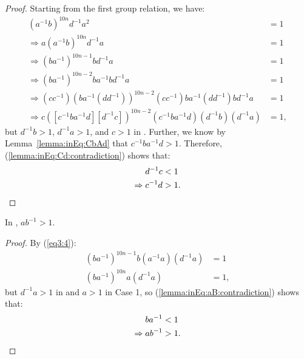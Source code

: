 \begin{proof} Starting from the first group relation, we have:
\begin{align}
(a^{-1}b)^{10n}d^{-1}a^{2}&=1\nonumber{}\\
\Rightarrow{}a(a^{-1}b)^{10n}d^{-1}a&=1\nonumber{}\\
\Rightarrow{}(ba^{-1})^{10n-1}bd^{-1}a&=1\label{eq3:4}\\
\Rightarrow{}(ba^{-1})^{10n-2}ba^{-1}bd^{-1}a&=1\nonumber{}\\
\Rightarrow{}(cc^{-1})(ba^{-1}(dd^{-1}))^{10n-2}(cc^{-1})ba^{-1}(dd^{-1})bd^{-1}a&=1\nonumber{}\\
\Rightarrow{}c([c^{-1}ba^{-1}d][d^{-1}c])^{10n-2}(c^{-1}ba^{-1}d)(d^{-1}b)(d^{-1}a)&=1,\label{lemma:inEq:Cd:contradiction}
\end{align}
but $d^{-1}b>1$, $d^{-1}a>1$, and $c>1$ in . Further, we know by Lemma~\ref{lemma:inEq:CbAd} that $c^{-1}ba^{-1}d>1$. Therefore, (\ref{lemma:inEq:Cd:contradiction}) shows that:
\begin{align*}
d^{-1}c&<1\\
\Rightarrow{}c^{-1}d&>1.\qedhere
\end{align*}
\end{proof}

\begin{lemma} In , $ab^{-1} > 1$.
\label{lemma:inEq:aB}
\end{lemma}

\begin{proof} By (\ref{eq3:4}):
\begin{align}
(ba^{-1})^{10n-1}b(a^{-1}a)(d^{-1}a)&=1\nonumber{}\\
(ba^{-1})^{10n}a(d^{-1}a)&=1,\label{lemma:inEq:aB:contradiction}
\end{align}
but $d^{-1}a>1$ in  and $a>1$ in Case 1, so (\ref{lemma:inEq:aB:contradiction}) shows that:
\begin{align*}
ba^{-1}&<1\\
\Rightarrow{}ab^{-1}&>1.\qedhere
\end{align*}
\end{proof}

